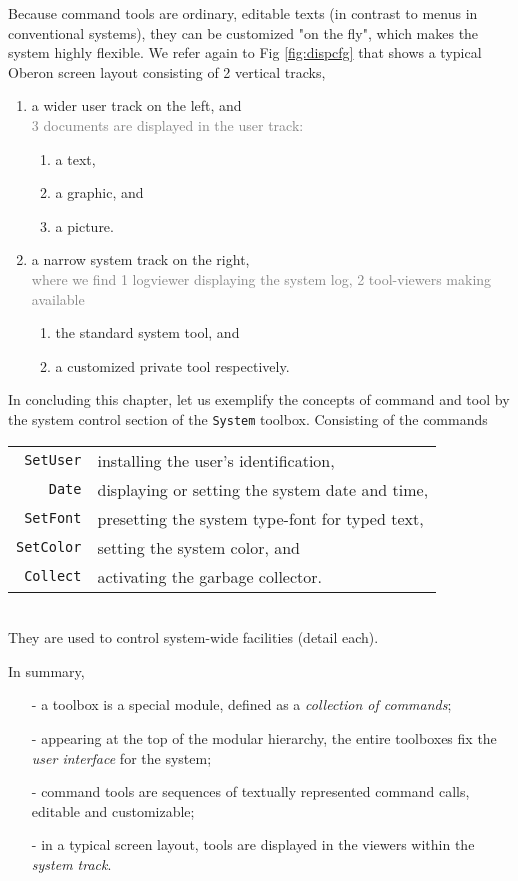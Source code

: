 Because command tools are ordinary, editable texts (in contrast to menus in conventional systems),
they can be customized "on the fly", which makes the system highly flexible.
We refer again to Fig \ref{fig:dispcfg} that shows a typical Oberon screen layout consisting
of 2 vertical tracks,
\begin{enumerate}
  \item a wider user track on the left, and\\
  \textcolor{gray}{3 documents are displayed in the user track:}
  \begin{enumerate}
    \item a text,
    \item a graphic, and
    \item a picture.
  \end{enumerate}
  \item a narrow system track on the right,\\
  \textcolor{gray}{where we find 1 logviewer displaying the system log, 2 tool-viewers making available}
  \begin{enumerate}
    \item the standard system tool, and
    \item a customized private tool respectively.
  \end{enumerate}
\end{enumerate}

In concluding this chapter, let us exemplify the concepts of command and tool by the system
control section of the \verb|System| toolbox. Consisting of the commands
\begin{table}[h!]
  \centering
  \begin{tabular}{r l}
    \verb|SetUser|  & \small{installing the user's identification,}\\
    \verb|Date|     & \small{displaying or setting the system date and time,}\\
    \verb|SetFont|  & \small{presetting the system type-font for typed text,}\\
    \verb|SetColor| & \small{setting the system color, and}\\
    \verb|Collect|  & \small{activating the garbage collector.}
  \end{tabular}
\end{table}
\\They are used to control system-wide facilities (detail each).

In summary,
\begin{itemize}
  \item[-] a toolbox is a special module, defined as a \emph{collection of commands};
  \item[-] appearing at the top of the modular hierarchy, the entire toolboxes
    fix the \emph{user interface} for the system;
  \item[-] command tools are sequences of textually represented command calls,
    editable and customizable;
  \item[-] in a typical screen layout, tools are displayed in the viewers
    within the \emph{system track}.
\end{itemize}
